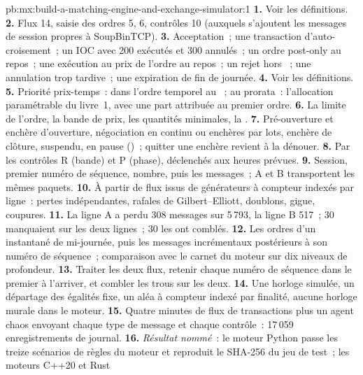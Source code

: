 \begin{solution}{pb:mx:build-a-matching-engine-and-exchange-simulator:1}
\textbf{1.} Voir les définitions.
\textbf{2.} Flux 14, saisie des ordres 5,  6, contrôles 10 (auxquels s'ajoutent les messages de session propres à SoupBinTCP).
\textbf{3.} Acceptation~; une transaction d'auto-croisement~; un IOC avec 200 exécutés et 300 annulés~; un ordre post-only au repos~; une exécution au prix de l'ordre au repos~; un
rejet hors ~; une annulation trop tardive~; une expiration de fin de journée.
\textbf{4.} Voir les définitions.
\textbf{5.} Priorité prix-temps~: dans l'ordre temporel au ~; au prorata~: l'allocation paramétrable du livre~1, avec une part attribuée au premier ordre.
\textbf{6.} La limite de l'ordre, la bande de prix, les quantités minimales, la .
\textbf{7.} Pré-ouverture et enchère d'ouverture, négociation en continu ou enchères par lots, enchère de clôture, suspendu, en pause ()~; quitter une enchère revient à la dénouer.
\textbf{8.} Par les contrôles R (bande) et P (phase), déclenchés aux heures prévues.
\textbf{9.} Session, premier numéro de séquence, nombre, puis les messages~; A et B transportent les mêmes paquets.
\textbf{10.} À partir de flux issus de générateurs à compteur indexés par ligne~: pertes indépendantes, rafales de Gilbert--Elliott, doublons, gigue, coupures.
\textbf{11.} La ligne A a perdu 308 messages sur 5\,793, la ligne B 517~; 30 manquaient sur les deux lignes~; 30  les ont comblés.
\textbf{12.} Les ordres d'un instantané de mi-journée, puis les messages incrémentaux postérieurs à son numéro de séquence~; comparaison avec le carnet du moteur sur dix niveaux de profondeur.
\textbf{13.} Traiter les deux flux, retenir chaque numéro de séquence dans le premier à l'arriver, et combler les trous sur les deux.
\textbf{14.} Une horloge simulée, un départage des égalités fixe, un aléa à compteur indexé par finalité, aucune horloge murale dans le moteur.
\textbf{15.} Quatre minutes de flux de transactions plus un agent chaos envoyant chaque type de message et chaque contrôle~: 17\,059 enregistrements de journal.
\textbf{16.} \emph{Résultat nommé}~: le moteur Python passe les treize scénarios de règles du moteur et reproduit le SHA-256 du jeu de test~; les moteurs C++20 et Rust

\end{solution}
